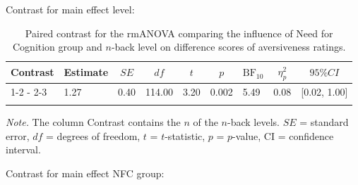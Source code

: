 \documentclass[
  man,floatsintext]{apa6}
\begin{document}
Contrast for main effect level:

\begin{table}[H]

\begin{center}
\begin{threeparttable}

\caption{\label{tab:unnamed-chunk-14}Paired contrast for the rmANOVA comparing the influence of Need for Cognition group and $n$-back level on difference scores of aversiveness ratings.}

\begin{tabular}{lllllllll}
\toprule
Contrast & \multicolumn{1}{c}{Estimate} & \multicolumn{1}{c}{$SE$} & \multicolumn{1}{c}{$df$} & \multicolumn{1}{c}{$t$} & \multicolumn{1}{c}{$p$} & \multicolumn{1}{c}{$\mathrm{BF}_{\textrm{10}}$} & \multicolumn{1}{c}{$\eta_{p}^{2}$} & \multicolumn{1}{c}{$95\% CI$}\\
\midrule
1-2 - 2-3 & 1.27 & 0.40 & 114.00 & 3.20 & 0.002 & 5.49 & 0.08 & {}[0.02, 1.00]\\
\bottomrule
\addlinespace
\end{tabular}

\begin{tablenotes}[para]
\normalsize{\textit{Note.} The column Contrast contains the $n$ of the $n$-back levels. $SE$ = standard error, $df$ = degrees of freedom, $t$ = $t$-statistic, $p$ = $p$-value, CI = confidence interval.}
\end{tablenotes}

\end{threeparttable}
\end{center}

\end{table}

Contrast for main effect NFC group:
\end{document}
